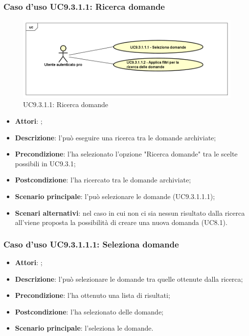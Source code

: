 		 \subsubsection{Caso d'uso UC9.3.1.1: Ricerca domande}
		 \label{UC9.3.1.1}
		 \begin{figure}[h]
		 	\centering
		 	\includegraphics[scale=0.5,keepaspectratio]{UML/UC9_3_1_1.png}
		 	\caption{UC9.3.1.1: Ricerca domande}
		 \end{figure}
		 \FloatBarrier
		 \begin{itemize}
		 	\item \textbf{Attori}: \uaupro;
		 	\item \textbf{Descrizione}: l'\uaupro può eseguire una ricerca tra le domande archiviate; 
		 	\item \textbf{Precondizione}: l'\uaupro ha selezionato l'opzione "Ricerca domande" tra le scelte possibili in UC9.3.1;
		 	\item \textbf{Postcondizione}: l'\uaupro ha ricercato tra le domande archiviate;
		 	\item \textbf{Scenario principale}: l'\uaupro può selezionare le domande (UC9.3.1.1.1); 
		 	\item \textbf{Scenari alternativi}: nel caso in cui non ci sia nessun risultato dalla ricerca all'\uaupro viene proposta la possibilità di creare una nuova domanda (UC8.1).
		 \end{itemize}
		 
		 \subsubsection{Caso d'uso UC9.3.1.1.1: Seleziona domande}
		 \label{UC9.3.1.1.1}
		 \begin{itemize}
		 	\item \textbf{Attori}: \uaupro;
		 	\item \textbf{Descrizione}: l'\uaupro può selezionare le domande tra quelle ottenute dalla ricerca;
		 	\item \textbf{Precondizione}: l'\uaupro ha ottenuto una lista di risultati;
		 	\item \textbf{Postcondizione}: l'\uaupro ha selezionato delle domande; 
		 	\item \textbf{Scenario principale}: l'\uaupro seleziona le domande.
		 \end{itemize}
		 
